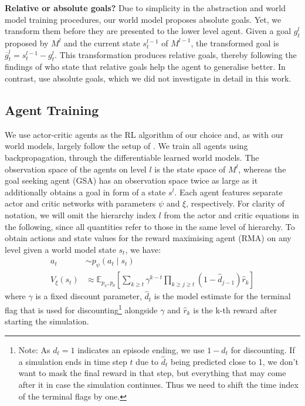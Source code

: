 \documentclass{article}
\DeclareMathOperator{\cond}{\vert}
\begin{document}
\textbf{Relative or absolute goals?} Due to simplicity in the abstraction and world model training procedures, our world model proposes absolute goals. Yet, we transform them before they are presented to the lower level agent. Given a goal $g_t^l$ proposed by $M^l$ and the current state $s_t^{l-1}$ of $M^{l-1}$, the transformed goal is $\overline{g}_t^{l} =  s_t^{l-1} - g_t^l$. This transformation produces relative goals, thereby following the findings of \citet{nachum2018data, zhang2020generating} who state that relative goals help the agent to generalise better. In contrast, \citet{vezhnevets2017feudal, hafner2022deep} use absolute goals, which we did not investigate in detail in this work.

\subsection{Agent Training}\label{sec:agent_training}

We use actor-critic agents as the RL algorithm of our choice and, as with our world models, largely follow the setup of \citet{hafner2019learning}. 
We train all agents using backpropagation, through the differentiable learned world models. 
The observation space of the agents on level $l$ is the state space of $M^l$, whereas the goal seeking agent (GSA) has an observation space twice as large as it additionally obtains a goal in form of a state $s^l$. 
Each agent features separate actor and critic networks with parameters $\psi$ and $\xi$, respectively. 
For clarity of notation, we will omit the hierarchy index $l$ from the actor and critic equations in the following, since all quantities refer to those in the same level of hierarchy. 
To obtain actions and state values for the reward maximising agent (RMA) on any level given a world model state $s_t$, we have:
\begin{align}
    a_t &\sim  p_\psi(a_t \cond s_t) \\
    V_\xi(s_t) & \approx \mathbb{E}_{p_\psi, p_\theta} \left[ \sum_{k \geq t} \gamma^{k-t} \prod_{k \geq j \geq t}(1 - \hat{d}_{j-1}) \hat{r}_k \right]
\end{align}
where $\gamma$ is a fixed discount parameter, $\hat{d}_t$ is the model estimate for the terminal flag that is used for discounting\footnote{Note: As $d_t = 1$ indicates an episode ending, we use $1 - \hat{d}_t$ for discounting. If a simulation ends in time step $t$ due to $\hat{d}_t$ being predicted close to 1, we don't want to mask the final reward in that step, but everything that may come after it in case the simulation continues. Thus we need to shift the time index of the terminal flags by one.} alongside $\gamma$ and $\hat{r}_k$ is the k-th reward after starting the simulation.
\end{document}
